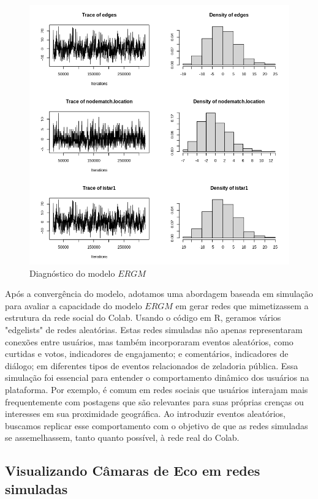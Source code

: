 \begin{figure}[!htb]
	\caption{Diagnóstico do modelo $ERGM$}
	\label{fig:ergm_diagnostics}
	\centering
	\includegraphics[scale=0.5]{images/ergm_diagnostics.png}
	\fautor
\end{figure}

Após a convergência do modelo, adotamos uma abordagem baseada em simulação para avaliar a capacidade do modelo $ERGM$ em gerar redes que mimetizassem a estrutura da rede social do Colab. Usando o código em R, geramos vários "edgelists" de redes aleatórias. Estas redes simuladas não apenas representaram conexões entre usuários, mas também incorporaram eventos aleatórios, como curtidas e votos, indicadores de engajamento; e comentários, indicadores de diálogo; em diferentes tipos de eventos relacionados de zeladoria pública. Essa simulação foi essencial para entender o comportamento dinâmico dos usuários na plataforma. Por exemplo, é comum em redes sociais que usuários interajam mais frequentemente com postagens que são relevantes para suas próprias crenças ou interesses em sua proximidade geográfica. Ao introduzir eventos aleatórios, buscamos replicar esse comportamento com o objetivo de que as redes simuladas se assemelhassem, tanto quanto possível, à rede real do Colab.

\subsection{Visualizando Câmaras de Eco em redes simuladas}

